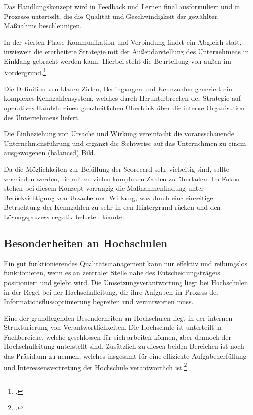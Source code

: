 Das Handlungskonzept wird in \glqq Feedback und Lernen\grqq{} final ausformuliert und in Prozesse 
unterteilt, die die Qualität und Geschwindigkeit der gewählten Maßnahme beschleunigen.

In der vierten Phase \glqq Kommunikation und Verbindung\grqq{} findet ein Abgleich statt, inwieweit die 
erarbeitete Strategie mit der Außendarstellung des Unternehmens in Einklang gebracht werden kann. Hierbei 
steht die Beurteilung von außen im Vordergrund.\footcite[35 ff.]{kaufmann_feinschliff_2002}

Die Definition von klaren Zielen, Bedingungen und Kennzahlen generiert ein komplexes 
Kennzahlensystem, welches durch Herunterbrechen der Strategie auf operatives Handeln einen 
ganzheitlichen Überblick über die interne Organisation des Unternehmens liefert.

Die Einbeziehung von Ursache und Wirkung vereinfacht die vorausschauende Unternehmensführung 
und ergänzt die Sichtweise auf das Unternehmen zu einem ausgewogenen (balanced) Bild. 

Da die Möglichkeiten zur Befüllung der Scorecard sehr vielseitig sind, sollte vermieden werden, sie mit zu 
vielen komplexen Zahlen zu überladen. Im Fokus stehen bei diesem Konzept vorrangig die 
Maßnahmenfindung unter Berücksichtigung von Ursache und Wirkung, was durch eine einseitige Betrachtung 
der Kennzahlen zu sehr in den Hintergrund rücken und den Lösungsprozess negativ belasten könnte.

\subsection{Besonderheiten an Hochschulen}
Ein gut funktionierendes Qualitätsmanagement kann nur effektiv und reibungslos funktionieren, wenn es an zentraler Stelle nahe des Entscheidungsträgers positioniert und gelebt wird.
Die Umsetzungsverantwortung liegt bei Hochschulen in der Regel bei der Hochschulleitung, die ihre Aufgaben im Prozess der Informationsflussoptimierung begreifen und verantworten muss.

Eine der grundlegenden Besonderheiten an Hochschulen liegt in der internen Strukturierung von Verantwortlichkeiten. Die Hochschule ist unterteilt in Fachbereiche, welche geschlossen für sich arbeiten können, aber dennoch der Hochschulleitung unterstellt sind. Zusätzlich zu diesen beiden Bereichen ist noch das Präsidium zu nennen, welches insgesamt für eine effiziente Aufgabenerfüllung und Interessensvertretung der Hochschule verantwortlich ist.\footcite[353 ff.]{mintzberg_1992}

